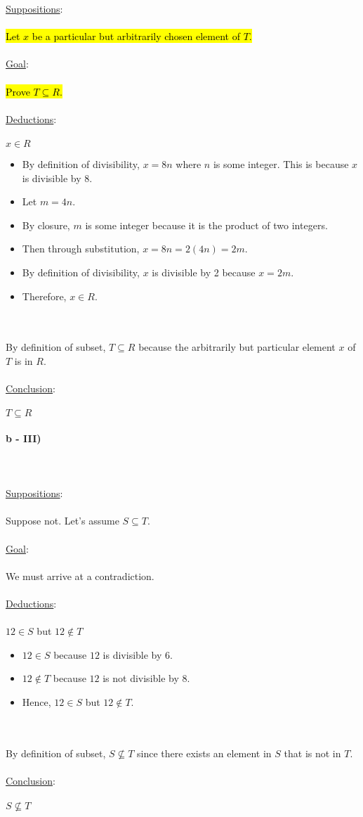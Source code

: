 \documentclass[12pt]{article}
\newcommand{\xlist}[1]{
    \begin{itemize}
        \renewcommand{\labelitemi}{$\centerdot$}
        #1
    \end{itemize}
    \newblock
    \\ \\
}
\newcommand{\xsupposition}[1]{
    \underline{Suppositions}:
    \\ \\
    #1
    \\ \\
}
\newcommand{\xgoal}[1]{
    \underline{Goal}:
    \\ \\
    #1
    \\ \\
}
\newcommand{\xdeductions}{
    \underline{Deductions}:
    \\ \\
}
\newcommand{\xconclusion}[1]{
    \underline{Conclusion}:
    \\ \\
    #1
    \\ \\
}
\begin{document}
\xsupposition{\hl{Let $x$ be a particular but arbitrarily chosen element of $T$.}}
\xgoal{\hl{Prove $T \subseteq R$.}}
\xdeductions
$x \in R$
\xlist{
  \item By definition of divisibility, $x = 8n$ where $n$ is some integer. This is because $x$ is divisible by 8.
  \item Let $m = 4n$.
  \item By closure, $m$ is some integer because it is the product of two integers.
  \item Then through substitution, $x = 8n = 2(4n) =2m$.
  \item By definition of divisibility, $x$ is divisible by 2 because $x = 2m$.
  \item Therefore, $x \in R$.
}
By definition of subset, $T \subseteq R$ because the arbitrarily but particular element $x$ of $T$ is in $R$. 
\\ \\
\xconclusion{$T \subseteq R$}
\textbf{b - III)} \\ \\
\\ \\
\xsupposition{Suppose not. Let's assume $S \subseteq T$.}
\xgoal{We must arrive at a contradiction.}
\xdeductions
$12 \in S$ but $12 \not\in T$
\xlist{
  \item $12 \in S$ because $12$ is divisible by 6.
  \item $12 \not\in T$ because $12$ is not divisible by 8.
  \item Hence, $12 \in S$ but $12 \not\in T$.
}
By definition of subset, $S \not\subseteq T$ since there exists an element in $S$ that is not in $T$.
\\ \\
\xconclusion{$S \not\subseteq T$}
\\ \\
\end{document}
